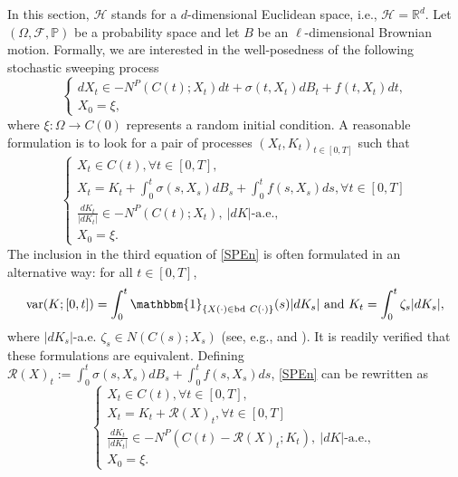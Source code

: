 \documentclass[preprint,12pt]{elsarticle}
\renewcommand{\H}{\mathcal{H}}
\newcommand{\R}{\mathbb{R}}
\newcommand{\bd}{{\operatorname{bd \ }}}
\newcommand{\var}{{\operatorname{var}}}
\theoremstyle{plain}
\theoremstyle{definition}
\theoremstyle{remark}
\begin{document}
	In this section, $\H$ stands for a $d$-dimensional Euclidean space, i.e., $\H = \R^d$. Let $(\Omega, \mathcal{F},\mathbb{P})$ be a probability space and let $B$ be an $\ell$-dimensional Brownian motion. 
    Formally, we are interested in the well-posedness of the following stochastic sweeping process  
	\begin{equation}\label{spe-gen}
		\left\{\begin{array}{l}
			dX_t \in -N^P(C(t);X_t)dt + \sigma(t,X_t)dB_t + f(t,X_t)dt,\\
			X_0 = \xi,
		\end{array}\right.
	\end{equation}
	where $\xi\colon \Omega\to C(0)$ represents a random initial condition.  
    A reasonable formulation is to look for a pair of processes $(X_t, K_t)_{t\in [0,T]}$ such that 
	\begin{equation}\label{SPEn}
		\left\{\begin{array}{l}
        X_t \in C(t), \forall t \in[0, T],\\
			X_t=K_t + \int_0^t \sigma(s,X_s)dB_s + \int_0^tf(s,X_s)ds, \forall t\in [0,T]\\
			\frac{dK_t}{|dK_t|} \in -N^P(C(t);X_t),\ \left|dK\right| \text {-a.e., }\\
			X_0 = \xi.
		\end{array}\right.
	\end{equation}
 The inclusion in the third equation of \eqref{SPEn} is often formulated in an alternative way: for all $t\in [0,T]$, 
\begin{equation*} 
\var(K;[0,t]) = \int_0^t \mathbbm{1}_{\{X(\cdot)\in \bd C(\cdot)\}}(s) |dK_s|\text{ and } K_t = \int_0^t \zeta_s |dK_s|,
\end{equation*}
 where $|dK_s|$-a.e. $\zeta_s\in N(C(s);X_s)$ (see, e.g., \cite[Definition 3.8]{MR2812587} and \cite[eq. 11]{MR745330}). It is readily verified that these formulations are equivalent.  Defining $\mathcal{R}(X)_t := \int_0^t \sigma(s,X_s)dB_s + \int_0^tf(s,X_s)ds$, \eqref{SPEn} can be rewritten as
    \begin{equation}\label{SPEnnnn}
		\left\{\begin{array}{l}
        X_t \in C(t), \forall t \in[0, T],\\
			X_t=K_t + \mathcal{R}(X)_t, \forall t\in [0,T]\\
			\frac{dK_t}{|dK_t|} \in -N^P(C(t)-\mathcal{R}(X)_t;K_t),\ \left|dK\right| \text {-a.e., }\\
			X_0 = \xi.
		\end{array}\right.
	\end{equation}
\end{document}
